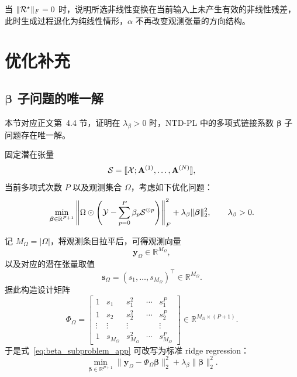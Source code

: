 \begin{remark}
当 $\|\mathcal{R}^\star\|_F=0$ 时，说明所选非线性变换在当前输入上未产生有效的非线性残差，此时生成过程退化为纯线性情形，$\alpha$ 不再改变观测张量的方向结构。
\end{remark}


\section{优化补充}

\subsection{$\boldsymbol\beta$ 子问题的唯一解}
\label{app:beta_unique}

本节对应正文第~4.4 节，证明在 $\lambda_\beta>0$ 时，NTD-PL 中的多项式链接系数 $\boldsymbol\beta$ 子问题存在唯一解。

固定潜在张量
\begin{equation}
\mathcal{S}=\llbracket \mathcal{X};\mathbf A^{(1)},\dots,\mathbf A^{(N)}\rrbracket,
\end{equation}
当前多项式次数 $P$ 以及观测集合 $\Omega$，考虑如下优化问题：
\begin{equation}
\min_{\boldsymbol\beta\in\mathbb R^{P+1}}
\left\|
\Omega\odot
\left(
\mathcal{Y}-\sum_{p=0}^{P}\beta_p \mathcal{S}^{\odot p}
\right)
\right\|_F^2
+
\lambda_\beta\|\boldsymbol\beta\|_2^2,
\qquad \lambda_\beta>0.
\label{eq:beta_subproblem_app}
\end{equation}

记 $M_\Omega=|\Omega|$，将观测条目拉平后，可得观测向量
\begin{equation}
\mathbf y_\Omega\in\mathbb R^{M_\Omega},
\end{equation}
以及对应的潜在张量取值
\begin{equation}
\mathbf s_\Omega=(s_1,\dots,s_{M_\Omega})^\top\in\mathbb R^{M_\Omega}.
\end{equation}
据此构造设计矩阵
\begin{equation}
\Phi_\Omega=
\begin{bmatrix}
1 & s_1 & s_1^2 & \cdots & s_1^P\\
1 & s_2 & s_2^2 & \cdots & s_2^P\\
\vdots & \vdots & \vdots & & \vdots\\
1 & s_{M_\Omega} & s_{M_\Omega}^2 & \cdots & s_{M_\Omega}^P
\end{bmatrix}
\in\mathbb R^{M_\Omega\times(P+1)}.
\label{eq:PhiOmega_app_def}
\end{equation}
于是式~\eqref{eq:beta_subproblem_app} 可改写为标准 ridge regression：
\begin{equation}
\min_{\boldsymbol\beta\in\mathbb R^{P+1}}
\|\mathbf y_\Omega - \Phi_\Omega \boldsymbol\beta\|_2^2
+
\lambda_\beta \|\boldsymbol\beta\|_2^2.
\label{eq:beta_ridge_app}
\end{equation}

